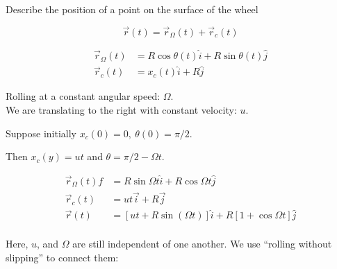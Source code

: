 \documentclass[10pt]{scrartcl}
\begin{document}
\begin{example}

Describe the position of a point on the surface of the wheel

\[\vec{r}(t) = \vec{r}_\Omega(t) + \vec{r}_c(t)\]
\begin{center}
\end{center}\vspace*{-5pt}
\[\begin{aligned}
\vec{r}_\Omega(t) &= R\cos\theta(t)\hat{i} + R\sin\theta(t)\hat{j}\\
\vec{r}_c(t) &= x_c(t)\hat{i} + R\hat{j}	
\end{aligned}
\]

Rolling at a constant angular speed: $\Omega$.\\
We are translating to the right with constant velocity: $u$.

Suppose initially $x_c(0) = 0,~ \theta(0) = \pi/2$. 

Then $x_c(y) = ut$ and $\theta = \pi/2 - \Omega t$. 

\[\begin{aligned}
\vec{r}_\Omega(t)f &= R\sin\Omega t \hat{i} + R\cos\Omega t \hat{j}\\
\vec{r}_c(t) &= ut\vec{i} + R\vec{j}\\
\vec{r}(t) &= [ut + R\sin(\Omega t)]\hat{i} + R[1 + \cos\Omega t]\hat{j}\\
\end{aligned}
\]

Here, $u$, and $\Omega$ are still independent of one another. We use ``rolling without slipping'' to connect them:\\


\end{example}
\end{document}
